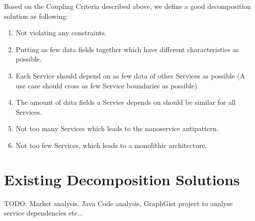 Based on the Coupling Criteria described above, we define a good decomposition solution as following:

\begin{enumerate}
	\item Not violating any constraints.
	\item Putting as few data fields together which have different characteristics as possible.
	\item Each Service should depend on as few data of other Services as possible (A use case should cross as few Service boundaries as possible).
	\item The amount of data fields a Service depends on should be similar for all Services.
	\item Not too many Services which leads to the nanoservice antipattern\cite{nanoservice}.
	\item Not too few Services, which leads to a monolithic architecture.
\end{enumerate}

\section{Existing Decomposition Solutions}

TODO: Market analysis. Java Code analysis, GraphGist project to analyse service dependencies etc...






